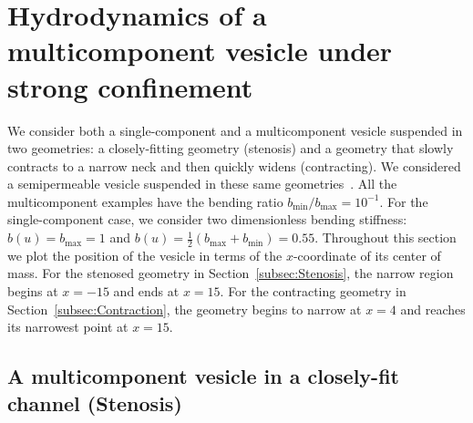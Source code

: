 \documentclass[twoside,twocolumn,9pt]{article}
\begin{document}






\section{\label{sec:results}Hydrodynamics of a multicomponent vesicle under strong confinement}
We consider both a single-component and a multicomponent vesicle suspended in two geometries: a closely-fitting geometry (stenosis) and a geometry that slowly contracts to a narrow neck and then quickly widens (contracting). We considered a semipermeable vesicle suspended in these same geometries~\cite{qua-gan-you2021}. All the multicomponent examples have the bending ratio $b_{\min}/b_{\max} = 10^{-1}$. For the single-component case, we consider two dimensionless bending stiffness: $b(u) = b_{\max} = 1$ and $b(u) = \frac{1}{2}(b_{\max} + b_{\min}) = 0.55$. Throughout this section we plot the position of the vesicle in terms of the $x$-coordinate of its center of mass. For the stenosed geometry in Section~\ref{subsec:Stenosis}, the narrow region begins at $x=-15$ and ends at $x=15$. For the contracting geometry in Section~\ref{subsec:Contraction}, the geometry begins to narrow at $x=4$ and reaches its narrowest point at $x=15$.

\subsection{\label{subsec:Stenosis}A multicomponent vesicle in a closely-fit channel (Stenosis)}
\end{document}
